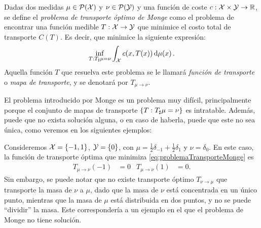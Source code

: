{{	  \begin{definition}
		  Dadas dos medidas $\mu \in \ProbSpace[\cX]$ y $\nu \in \ProbSpace[\cY]$ y una función de coste $c : \cX \times \cY \to \R$, se define el \emph{problema de transporte óptimo de Monge} como el problema de encontrar una función medible $T: \cX \to \cY$ que minimice el costo total de transporte $C(T)$. Es decir, que minimice la siguiente expresión:
		  \begin{equation}
			  \label{eq:problemaTransporteMonge}
			  \inf_{T: \Tpf \mu = \nu} \int_{\cX} c(x, T(x)) \dmu[x].
		  \end{equation}
		  Aquella función $T$ que resuelva este problema se le llamará \emph{función de transporte} o \emph{mapa de transporte}, y se denotará por $T_{\mu \to \nu}$.
	  \end{definition}

	  El problema introducido por Monge \cite{monge1781memoire} es un problema muy difícil, principalmente porque el conjunto de mapas de transporte $\left\{ T : \Tpf \mu = \nu \right\}$ es intratable. Además, puede que no exista solución alguna, o en caso de haberla, puede que este no sea única, como veremos en los siguientes ejemplos:

	  \begin{example}\label{ex:problemaDeMongeSinSolucion}
		  Consideremos $\cX = \left\{ -1, 1 \right\}$, $\cY = \left\{ 0 \right\}$, con $\mu = \frac{1}{2} \delta_{-1} + \frac{1}{2} \delta_{1}$ y $\nu = \delta_0$. En este caso, la función de transporte óptima que minimiza \eqref{eq:problemaTransporteMonge} es
		  \begin{align*}
			  T_{\mu \to \nu}(-1) & = 0 & T_{\mu \to \nu}(1) & = 0.
		  \end{align*}
		  Sin embargo, se puede notar que no existe transporte óptimo $T_{\nu \to \mu}$  que transporte la masa de $\nu$ a $\mu$, dado que la masa de $\nu$ está concentrada en un único punto, mientras que la masa de $\mu$ está distribuida en dos puntos, y no se puede ``dividir'' la masa. Este correspondería a un ejemplo en el que el problema de Monge no tiene solución.
	  \end{example}

}}

